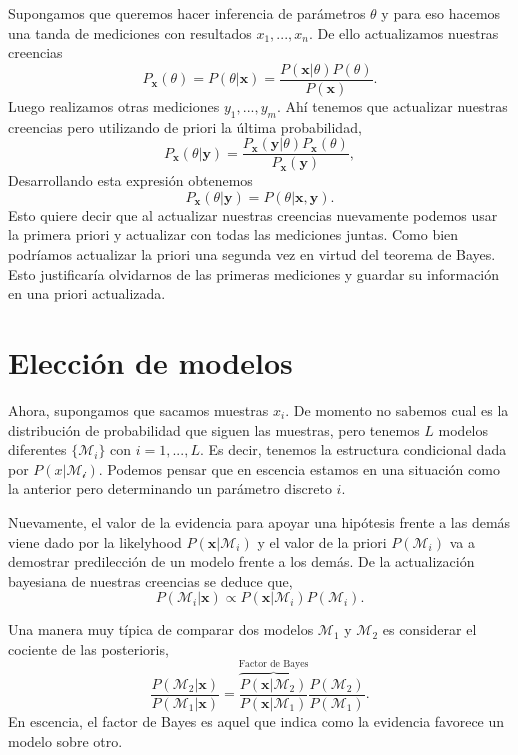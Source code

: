 Supongamos que queremos hacer inferencia de par\'ametros $\theta$ y para eso hacemos una tanda de mediciones con resultados $x_1,...,x_n$. De ello actualizamos nuestras creencias
\begin{equation}
    P_\mathbf{x}(\theta)=P(\theta|\mathbf{x}) = \frac{P(\mathbf{x}|\theta)P(\theta)}{P(\mathbf{x})}.
\end{equation}
Luego realizamos otras mediciones $y_1,...,y_m$. Ah\'i tenemos que actualizar nuestras creencias pero utilizando de priori la \'ultima probabilidad,
\begin{equation}
    P_\mathbf{x}(\theta|\mathbf{y}) = \frac{P_\mathbf{x}(\mathbf{y}|\theta)P_\mathbf{x}(\theta)}{P_\mathbf{x}(\mathbf{y})},
\end{equation}
Desarrollando esta expresi\'on obtenemos 
\begin{equation}
    P_\mathbf{x}(\theta|\mathbf{y}) = P(\theta|\mathbf{x,y}).
\end{equation}
Esto quiere decir que al actualizar nuestras creencias nuevamente podemos usar la primera priori y actualizar con todas las mediciones juntas. Como bien podr\'iamos actualizar la priori una segunda vez en virtud del teorema de Bayes. Esto justificar\'ia olvidarnos de las primeras mediciones y guardar su informaci\'on en una priori actualizada.
\section{Elecci\'on de modelos}

Ahora, supongamos que sacamos muestras $x_i$. De momento no sabemos cual es la distribuci\'on de probabilidad que siguen las muestras, pero tenemos $L$ modelos diferentes $\{\mathcal{M}_i\}$ con $i=1,...,L$. Es decir, tenemos la estructura condicional dada por $P(x|\mathcal{M_i})$. Podemos pensar que en escencia estamos en una situaci\'on como la anterior pero determinando un par\'ametro discreto $i$.

Nuevamente, el valor de la evidencia para apoyar una hip\'otesis frente a las dem\'as viene dado por la likelyhood $P(\mathbf{x}|\mathcal{M}_i)$ y el valor de la priori $P(\mathcal{M}_i)$ va a demostrar predilecci\'on de un modelo frente a los dem\'as. De la actualizaci\'on bayesiana de nuestras creencias se deduce que,
\begin{equation}
    P(\mathcal{M}_i|\mathbf{x}) \propto P(\mathbf{x}|\mathcal{M}_i)P(\mathcal{M}_i).
\end{equation}

Una manera muy t\'ipica de comparar dos modelos $\mathcal{M}_1$ y $\mathcal{M}_2$ es considerar el cociente de las posterioris,
\begin{equation}
    \frac{P(\mathcal{M}_2|\mathbf{x})}{P(\mathcal{M}_1|\mathbf{x})}
    =
    \overbrace{\frac{P(\mathbf{x}|\mathcal{M}_2)}{P(\mathbf{x}|\mathcal{M}_1)}}^{\text{Factor de Bayes}}\frac{P(\mathcal{M}_2)}{P(\mathcal{M}_1)}.
\end{equation} 
En escencia, el factor de Bayes es aquel que indica como la evidencia favorece un modelo sobre otro.


